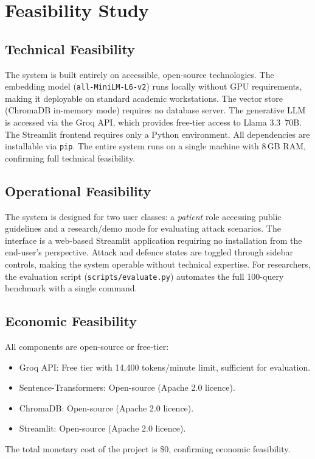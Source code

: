 
\section{Feasibility Study}

\subsection{Technical Feasibility}
The system is built entirely on accessible, open-source technologies. The embedding model
(\texttt{all-MiniLM-L6-v2}) runs locally without GPU requirements, making it deployable on
standard academic workstations. The vector store (ChromaDB in-memory mode) requires no
database server. The generative LLM is accessed via the Groq API, which provides free-tier
access to Llama 3.3~70B. The Streamlit frontend requires only a Python environment.
All dependencies are installable via \texttt{pip}. The entire system runs on a single machine
with 8\,GB RAM, confirming full technical feasibility.

\subsection{Operational Feasibility}
The system is designed for two user classes: a \textit{patient} role accessing public
guidelines and a research/demo mode for evaluating attack scenarios. The interface is a
web-based Streamlit application requiring no installation from the end-user's perspective.
Attack and defence states are toggled through sidebar controls, making the system operable
without technical expertise. For researchers, the evaluation script
(\texttt{scripts/evaluate.py}) automates the full 100-query benchmark with a single command.

\subsection{Economic Feasibility}
All components are open-source or free-tier:
\begin{itemize}
    \item Groq API: Free tier with 14{,}400 tokens/minute limit, sufficient for evaluation.
    \item Sentence-Transformers: Open-source (Apache 2.0 licence).
    \item ChromaDB: Open-source (Apache 2.0 licence).
    \item Streamlit: Open-source (Apache 2.0 licence).
\end{itemize}
The total monetary cost of the project is \$0, confirming economic feasibility.

